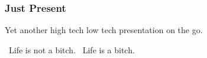 \documentclass[12pt,hyperref=true,mathserif]{beamer}
\begin{document}
\begin{frame}[fragile]
  \frametitle{Just Present}
  Yet another high tech low tech presentation on the go.
  \begin{algorithmic}
    \REQUIRE~Life is not a bitch.
    \ENSURE~Life is a bitch.
  \end{algorithmic}
\end{frame}
\end{document}
